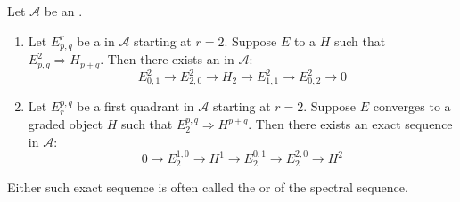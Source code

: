 \begin{proposition} \label{proposition:five_term_exact_sequence_exact_sequence_of_low_degree_terms_for_a_convergent_first_quadrant_spectral_sequence_in_an_abelian_category}
Let $\mathcal{A}$ be an . 
\begin{enumerate}
    \item Let $E^r_{p,q}$ be a   in $\mathcal{A}$ starting at $r=2$. Suppose $E$  to a  $H$ such that $E^2_{p,q} \Rightarrow H_{p+q}$. Then there exists an  in $\mathcal{A}$:
    $$E^2_{0,1} \to E^2_{2,0} \to H_2 \to E^2_{1,1} \to E^2_{0,2} \to 0$$
    
    \item Let $E_r^{p,q}$ be a first quadrant  in $\mathcal{A}$ starting at $r=2$. Suppose $E$ converges to a graded object $H$ such that $E_2^{p,q} \Rightarrow H^{p+q}$. Then there exists an exact sequence in $\mathcal{A}$:
    $$0 \to E_2^{1,0} \to H^1 \to E_2^{0,1} \to E_2^{2,0} \to H^2$$
\end{enumerate}
Either such exact sequence is often called the  or  of the spectral sequence.
\end{proposition}